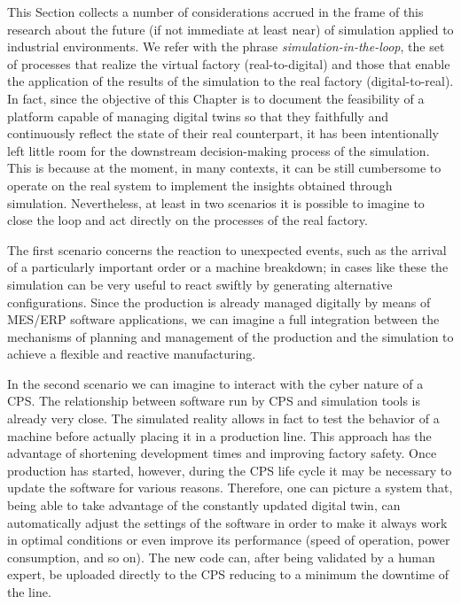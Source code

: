 This Section collects a number of considerations accrued in the frame of this research about the future (if not immediate at least near) of simulation applied to industrial environments. 
We refer with the phrase \textit{simulation-in-the-loop}, the set of processes that realize the virtual factory (real-to-digital) and those that enable the application of the results of the simulation to the real factory (digital-to-real). 
In fact, since the objective of this Chapter is to document the feasibility of a platform capable of managing digital twins so that they faithfully and continuously reflect the state of their real counterpart, it has been intentionally left little room for the downstream decision-making process of the simulation. 
This is because at the moment, in many contexts, it can be still cumbersome to operate on the real system to implement the insights obtained through simulation. 
Nevertheless, at least in two scenarios it is possible to imagine to close the loop and act directly on the processes of the real factory. 

The first scenario concerns the reaction to unexpected events, such as the arrival of a particularly important order or a machine breakdown; in cases like these the simulation can be very useful to react swiftly by generating alternative configurations. Since the production is already managed digitally by means of MES/ERP software applications, we can imagine a full integration between the mechanisms of planning and management of the production and the simulation to achieve a flexible and reactive manufacturing. 

In the second scenario we can imagine to interact with the cyber nature of a CPS. The relationship between software run by CPS and simulation tools is already very close. The simulated reality allows in fact to test the behavior of a machine before actually placing it in a production line. This approach has the advantage of shortening development times and improving factory safety. Once production has started, however, during the CPS life cycle it may be necessary to update the software for various reasons. Therefore, one can picture a system that, being able to take advantage of the constantly updated digital twin, can automatically adjust the settings of the software in order to make it always work in optimal conditions or even improve its performance (speed of operation, power consumption, and so on). The new code can, after being validated by a human expert, be uploaded directly to the CPS reducing to a minimum the downtime of the line. 
